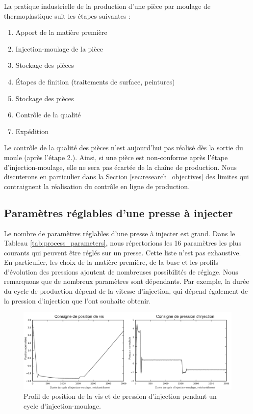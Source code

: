 La pratique industrielle de la production d'une pièce par moulage de thermoplastique suit les étapes suivantes :
\begin{enumerate}
	\item Apport de la matière première
	\item Injection-moulage de la pièce
	\item Stockage des pièces
	\item Étapes de finition (traitements de surface, peintures) 
	\item Stockage des pièces
	\item Contrôle de la qualité
	\item Expédition
\end{enumerate}
Le contrôle de la qualité des pièces n'est aujourd'hui pas réalisé dès la sortie du moule (après l'étape 2.).
Ainsi, si une pièce est non-conforme après l'étape d'injection-moulage, elle ne sera pas écartée de la chaîne de production.
Nous discuterons en particulier dans la Section \ref{sec:research_objectives} des limites qui contraignent la réalisation du contrôle en ligne de production.

\subsection{Paramètres réglables d'une presse à injecter} \label{subsec:process_parameters}

Le nombre de paramètres réglables d'une presse à injecter est grand.
Dans le Tableau \ref{tab:process_parameters}, nous répertorions les 16 paramètres les plus courants qui peuvent être réglés sur un presse.
Cette liste n'est pas exhaustive.
En particulier, les choix de la matière première, de la buse et les profils d'évolution des pressions ajoutent de nombreuses possibilités de réglage.
Nous remarquons que de nombreux paramètres sont dépendants.
Par exemple, la durée du cycle de production dépend de la vitesse d'injection, qui dépend également de la pression d'injection que l'ont souhaite obtenir.

\begin{figure}[bthp]
	\centering
	\includegraphics[width=\textwidth,height=\textheight,keepaspectratio]{../Chap1/Figures/part1_std_signals.png}
	\caption{Profil de position de la vis et de pression d'injection pendant un cycle d'injection-moulage.}
	\label{fig:molding_control}
\end{figure}

